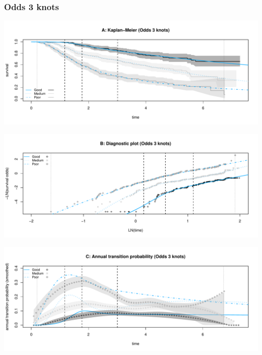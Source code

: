\documentclass[
]{article}
\begin{document}
\clearpage

\subsubsection{Odds 3 knots}\label{odds-3-knots}

\begin{flushleft}\includegraphics[height=0.25\textheight]{BC_OS_output/Images/Figure_spline_models-16} \end{flushleft}

\begin{flushleft}\includegraphics[height=0.25\textheight]{BC_OS_output/Images/Figure_spline_models-17} \end{flushleft}

\begin{flushleft}\includegraphics[height=0.25\textheight]{BC_OS_output/Images/Figure_spline_models-18} \end{flushleft}
\end{document}
